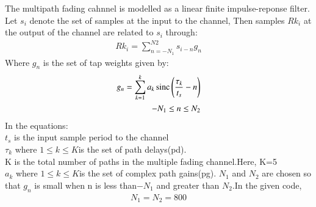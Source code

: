 The multipath fading cahnnel is modelled as a linear finite impulse-reponse filter.
\\
Let $s_i$ denote the set of samples at the input to the channel, Then samples $Rk_i$ at the output of the channel are related to $s_i$ through:
\begin{align}
Rk_i=\sum_{n=-N_1}^{N2}s_{i-n}g_n
\end{align}
Where $g_n$ is the set of tap weights given by:
\begin{align}
g_n = \sum_{k=1}^{k}a_k \operatorname*{sinc}{\left(\frac{\tau_k}{t_s}-n\right)}
\\
-N_1 \leq n \leq N_2
\end{align}
In the equations:
\\$t_s$ is the input sample period to the channel
\\$\tau_k$ where $1\leq k \leq K$is the set of path delays(pd).
\\K is the total number of paths in the multiple fading channel.Here, K=5 
\\$a_k$ where $1\leq k \leq K$is the set of complex path gains(pg).
$N_1$ and $N_2$ are chosen so that $g_n$ is small when n is less than$-N_1$ and greater than $N_2$.In the given code,
\begin{align}
N_1=N_2=800
\end{align}
